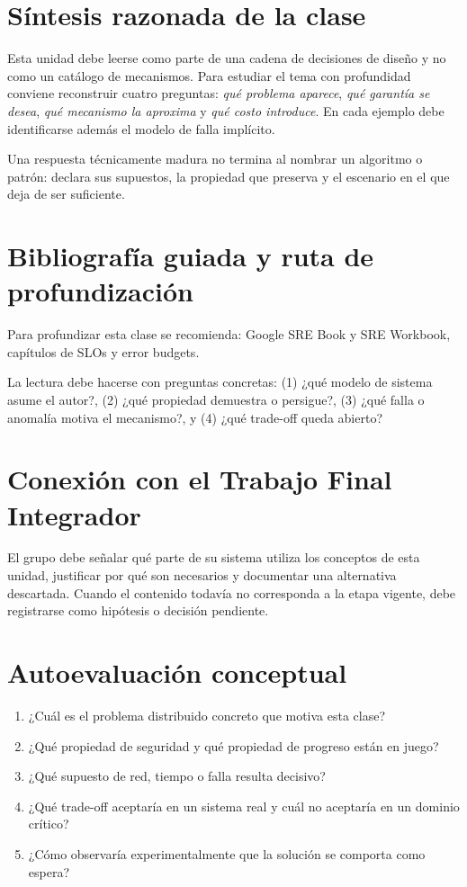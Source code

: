 \documentclass[variant=apuntes,cover=institutional,mode=screen]{ua-engineering-v6-article}
\begin{document}
\section{Síntesis razonada de la clase}
Esta unidad debe leerse como parte de una cadena de decisiones de diseño y no como un catálogo de mecanismos. Para estudiar el tema con profundidad conviene reconstruir cuatro preguntas: \emph{qué problema aparece}, \emph{qué garantía se desea}, \emph{qué mecanismo la aproxima} y \emph{qué costo introduce}. En cada ejemplo debe identificarse además el modelo de falla implícito.

\begin{uakeybox}
Una respuesta técnicamente madura no termina al nombrar un algoritmo o patrón: declara sus supuestos, la propiedad que preserva y el escenario en el que deja de ser suficiente.
\end{uakeybox}

\section{Bibliografía guiada y ruta de profundización}
Para profundizar esta clase se recomienda: Google SRE Book y SRE Workbook, capítulos de SLOs y error budgets.

La lectura debe hacerse con preguntas concretas: (1) ¿qué modelo de sistema asume el autor?, (2) ¿qué propiedad demuestra o persigue?, (3) ¿qué falla o anomalía motiva el mecanismo?, y (4) ¿qué trade-off queda abierto?

\section{Conexión con el Trabajo Final Integrador}
El grupo debe señalar qué parte de su sistema utiliza los conceptos de esta unidad, justificar por qué son necesarios y documentar una alternativa descartada. Cuando el contenido todavía no corresponda a la etapa vigente, debe registrarse como hipótesis o decisión pendiente.

\section{Autoevaluación conceptual}
\begin{enumerate}
\item ¿Cuál es el problema distribuido concreto que motiva esta clase?
\item ¿Qué propiedad de seguridad y qué propiedad de progreso están en juego?
\item ¿Qué supuesto de red, tiempo o falla resulta decisivo?
\item ¿Qué trade-off aceptaría en un sistema real y cuál no aceptaría en un dominio crítico?
\item ¿Cómo observaría experimentalmente que la solución se comporta como espera?
\end{enumerate}
\end{document}

